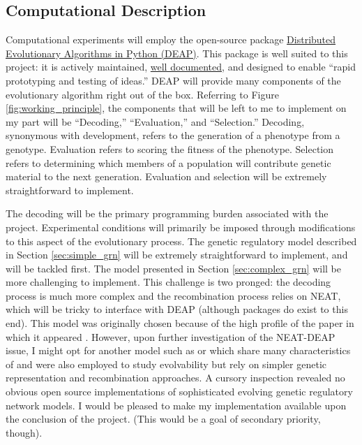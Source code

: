 \subsection{Computational Description}

Computational experiments will employ the open-source package \href{https://github.com/DEAP/deap}{Distributed Evolutionary Algorithms in Python (DEAP)}. This package is well suited to this project: it is actively maintained, \href{http://deap.readthedocs.io/en/master/}{well documented}, and designed to enable ``rapid prototyping and testing of ideas.'' DEAP will provide many components of the evolutionary algorithm right out of the box. Referring to Figure \ref{fig:working_principle}, the components that will be left to me to implement on my part will be ``Decoding,'' ``Evaluation,'' and ``Selection.'' Decoding, synonymous with development, refers to the generation of a phenotype from a genotype. Evaluation refers to scoring the fitness of the phenotype. Selection refers to determining which members of a population will contribute genetic material to the next generation. Evaluation and selection will be extremely straightforward to implement.

The decoding will be the primary programming burden associated with the project. Experimental conditions will primarily be imposed through modifications to this aspect of the evolutionary process. The genetic regulatory model described in Section \ref{sec:simple_grn} will be extremely straightforward to implement, and will be tackled first. The model presented in Section \ref{sec:complex_grn} will be more challenging to implement. This challenge is two pronged: the decoding process is much more complex and the recombination process relies on NEAT, which will be tricky to interface with DEAP (although packages do exist to this end). This model was originally chosen because of the high profile of the paper in which it appeared \cite[p 347]{Downing2015IntelligenceSystems}. However, upon further investigation of the NEAT-DEAP issue, I might opt for another model such as \cite{DwightKuo2006NetworkDivergence} or \cite{Quayle2006ModellingNetworks} which share many characteristics of \cite{Reisinger2005TowardsEvolvability} and were also employed to study evolvability but rely on simpler genetic representation and recombination approaches. A cursory inspection revealed no obvious open source implementations of sophisticated evolving genetic regulatory network models. I would be pleased to make my implementation available upon the conclusion of the project. (This would be a goal of secondary priority, though).



